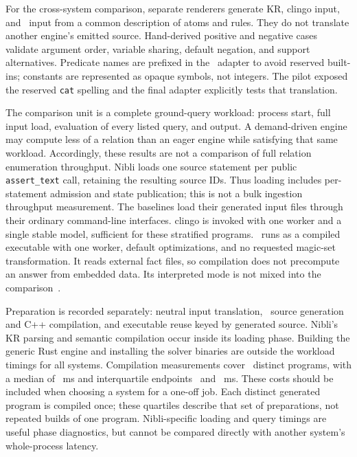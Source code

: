 For the cross-system comparison, separate renderers generate KR, clingo input,
and \Souffle\ input from a common description of atoms and rules. They do not
translate another engine's emitted source. Hand-derived positive and negative
cases validate argument order, variable sharing, default negation, and support
alternatives. Predicate names are prefixed in the \Souffle\ adapter to avoid
reserved built-ins; constants are represented as opaque symbols, not integers.
The pilot exposed the reserved \texttt{cat} spelling and the final adapter
explicitly tests that translation.

The comparison unit is a complete ground-query workload: process start, full
input load, evaluation of every listed query, and output. A demand-driven
engine may compute less of a relation than an eager engine while satisfying
that same workload. Accordingly, these results are not a comparison of full
relation enumeration throughput. Nibli loads one source statement per public
\texttt{assert\_text} call, retaining the resulting source IDs. Thus loading
includes per-statement admission and state publication; this is not a bulk
ingestion throughput measurement. The baselines load their generated input
files through their ordinary command-line interfaces.
clingo is invoked with one worker and a
single stable model, sufficient for these stratified programs. \Souffle\ runs
as a compiled executable with one worker, default optimizations, and no
requested magic-set transformation. It reads external fact files, so compilation
does not precompute an answer from embedded data. Its interpreted mode is not
mixed into the comparison~\cite{souffle-execute}.

Preparation is recorded separately: neutral input translation, \Souffle\ source
generation and C++ compilation, and executable reuse keyed by generated source.
Nibli's KR parsing and semantic compilation occur inside its loading phase.
Building the generic Rust engine and installing the solver binaries are outside
the workload timings for all systems.
Compilation measurements cover \CompiledPrograms\ distinct programs, with a
median of \CompilationMedianMs~ms and interquartile endpoints
\CompilationQOneMs\ and \CompilationQThreeMs~ms. These costs should be included
when choosing a system for a one-off job. Each distinct generated program is
compiled once; these quartiles describe that set of preparations, not repeated
builds of one program. Nibli-specific loading and query
timings are useful phase diagnostics, but cannot be compared directly with
another system's whole-process latency.

